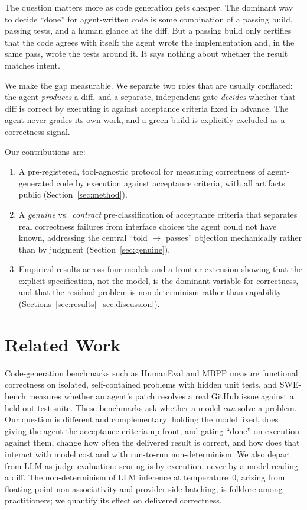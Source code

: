 \documentclass[11pt]{article}
\begin{document}
The question matters more as code generation gets cheaper. The dominant way to decide ``done'' for agent-written code is some combination of a passing build, passing tests, and a human glance at the diff. But a passing build only certifies that the code agrees with itself: the agent wrote the implementation and, in the same pass, wrote the tests around it. It says nothing about whether the result matches intent.

We make the gap measurable. We separate two roles that are usually conflated: the agent \emph{produces} a diff, and a separate, independent gate \emph{decides} whether that diff is correct by executing it against acceptance criteria fixed in advance. The agent never grades its own work, and a green build is explicitly excluded as a correctness signal.

Our contributions are:
\begin{enumerate}
\item A pre-registered, tool-agnostic protocol for measuring correctness of agent-generated code by execution against acceptance criteria, with all artifacts public (Section~\ref{sec:method}).
\item A \emph{genuine} vs.\ \emph{contract} pre-classification of acceptance criteria that separates real correctness failures from interface choices the agent could not have known, addressing the central ``told $\rightarrow$ passes'' objection mechanically rather than by judgment (Section~\ref{sec:genuine}).
\item Empirical results across four models and a frontier extension showing that the explicit specification, not the model, is the dominant variable for correctness, and that the residual problem is non-determinism rather than capability (Sections~\ref{sec:results}--\ref{sec:discussion}).
\end{enumerate}

\section{Related Work}

Code-generation benchmarks such as HumanEval and MBPP measure functional correctness on isolated, self-contained problems with hidden unit tests, and SWE-bench measures whether an agent's patch resolves a real GitHub issue against a held-out test suite. These benchmarks ask whether a model \emph{can} solve a problem. Our question is different and complementary: holding the model fixed, does giving the agent the acceptance criteria up front, and gating ``done'' on execution against them, change how often the delivered result is correct, and how does that interact with model cost and with run-to-run non-determinism. We also depart from LLM-as-judge evaluation: scoring is by execution, never by a model reading a diff. The non-determinism of LLM inference at temperature~0, arising from floating-point non-associativity and provider-side batching, is folklore among practitioners; we quantify its effect on delivered correctness.
\end{document}
